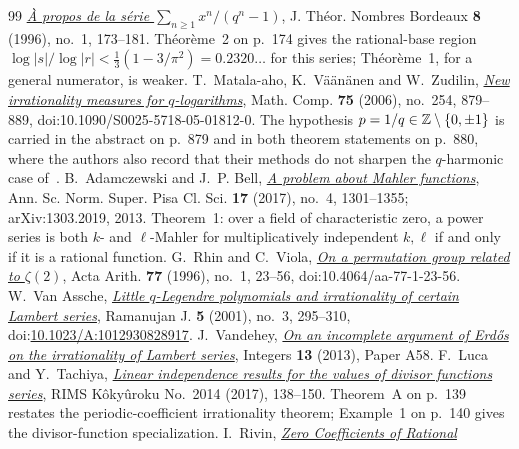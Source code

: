 \documentclass[11pt]{article}
\begin{document}
\begin{thebibliography}{99}
  \href{https://numdam.org/item/JTNB_1996__8_1_173_0.pdf}{\emph{\`A propos de la
  s\'erie $\sum_{n\ge1}x^{n}/(q^{n}-1)$}},
  J. Th\'eor. Nombres Bordeaux \textbf{8} (1996), no.~1, 173--181.
  Th\'eor\`eme~2 on p.~174 gives the rational-base region
  $\log|s|/\log|r|<\frac13(1-3/\pi^{2})=0.2320\ldots$ for this series;
  Th\'eor\`eme~1, for a general numerator, is weaker.
 T.~Matala-aho, K.~V\"a\"an\"anen and W.~Zudilin,
  \href{https://doi.org/10.1090/S0025-5718-05-01812-0}{\emph{New irrationality
  measures for \(q\)-logarithms}}, Math. Comp. \textbf{75} (2006), no.~254,
  879--889, doi:10.1090/S0025-5718-05-01812-0.  The hypothesis
  \(p=1/q\in\mathbb{Z}\mathbin{\backslash}\{0,\pm1\}\) is carried in the abstract on p.~879 and in
  both theorem statements on p.~880, where the authors also record that their
  methods do not sharpen the \(q\)-harmonic case of~\cite{zudilin2004}.
 B.~Adamczewski and J.~P. Bell,
  \href{https://arxiv.org/abs/1303.2019}{\emph{A problem about Mahler
  functions}}, Ann. Sc. Norm. Super. Pisa Cl. Sci. \textbf{17} (2017), no.~4,
  1301--1355; arXiv:1303.2019, 2013.  Theorem~1: over a field of characteristic
  zero, a power series is both \(k\)- and \(\ell\)-Mahler for multiplicatively
  independent \(k,\ell\) if and only if it is a rational function.
 G.~Rhin and C.~Viola,
  \href{https://geodesic.mathdoc.fr/articles/10.4064/aa-77-1-23-56/}
  {\emph{On a permutation group related to $\zeta(2)$}},
  Acta Arith. \textbf{77} (1996), no.~1, 23--56,
  doi:10.4064/aa-77-1-23-56.
 W.~Van Assche,
  \href{https://arxiv.org/abs/math/0101187}{\emph{Little \(q\)-Legendre
  polynomials and irrationality of certain Lambert series}},
  Ramanujan J. \textbf{5} (2001), no.~3, 295--310,
  doi:\href{https://doi.org/10.1023/A:1012930828917}{10.1023/A:1012930828917}.
 J.~Vandehey,
  \href{https://arxiv.org/abs/1206.0340}{\emph{On an incomplete argument of
  Erd\H{o}s on the irrationality of Lambert series}},
  Integers \textbf{13} (2013), Paper A58.
 F.~Luca and Y.~Tachiya,
  \href{https://www.kurims.kyoto-u.ac.jp/~kyodo/kokyuroku/contents/pdf/2014-14.pdf}
  {\emph{Linear independence results for the values of divisor functions
  series}}, RIMS K\^oky\^uroku No.~2014 (2017), 138--150.
  Theorem~A on p.~139 restates the periodic-coefficient irrationality theorem;
  Example~1 on p.~140 gives the divisor-function specialization.
 I.~Rivin,
\href{https://arxiv.org/abs/2604.25151}{\emph{Zero Coefficients of Rational
}}
\end{thebibliography}
\end{document}
